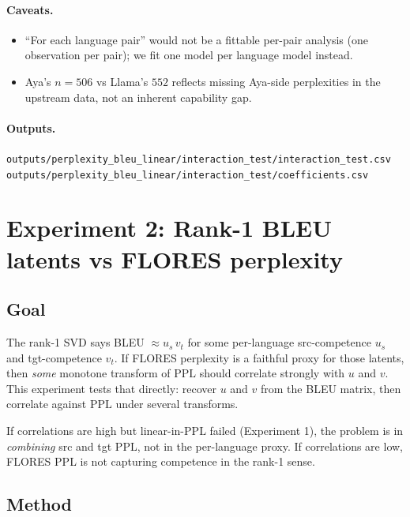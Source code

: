 \documentclass[11pt]{article}
\newcommand{\code}[1]{\texttt{\small #1}}
\newcommand{\ppl}{\mathrm{PPL}}
\begin{document}
\paragraph{Caveats.}

\begin{itemize}
  \item ``For each language pair'' would not be a fittable per-pair
    analysis (one observation per pair); we fit one model per language
    model instead.
  \item Aya's $n=506$ vs Llama's $552$ reflects missing Aya-side
    perplexities in the upstream data, not an inherent capability gap.
\end{itemize}

\paragraph{Outputs.}

\code{outputs/perplexity\_bleu\_linear/interaction\_test/interaction\_test.csv} \\
\code{outputs/perplexity\_bleu\_linear/interaction\_test/coefficients.csv}

\section{Experiment 2: Rank-1 BLEU latents vs FLORES perplexity}

\subsection{Goal}

The rank-1 SVD says BLEU $\approx u_s \, v_t$ for some per-language
src-competence $u_s$ and tgt-competence $v_t$. If FLORES perplexity is a
faithful proxy for those latents, then \emph{some} monotone transform of
$\ppl$ should correlate strongly with $u$ and $v$. This experiment tests
that directly: recover $u$ and $v$ from the BLEU matrix, then correlate
against $\ppl$ under several transforms.

If correlations are high but linear-in-$\ppl$ failed (Experiment 1), the
problem is in \emph{combining} src and tgt PPL, not in the per-language
proxy. If correlations are low, FLORES PPL is not capturing competence in
the rank-1 sense.

\subsection{Method}
\end{document}
